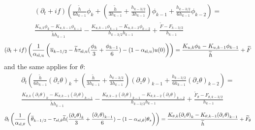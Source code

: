 \begin{equation}
\label{eq:ND_Ocean_prognosticu_FVfree}
    \begin{aligned}
(\partial_t + if)
	    \left(\frac{\widetilde{h}}{6h_{k-1}} 
    \phi_k
    +
    \left(
	    \frac{\widetilde{h}}{3h_{k-1}} 
	    + \frac{h_{k-3/2}}{3h_{k-1}}
    \right)
	    \phi_{k-1}
	    + \frac{h_{k-3/2}}{6h_{k-1}} \phi_{k-2}\right)
    = \\
	     \frac{K_{u, k} \phi_{k} -
	    K_{u,k-1} \phi_{k-1} }{\widetilde{h}h_{k-1}} -
\frac{K_{u, k-1} \phi_{k-1} - K_{u, k-2} \phi_{k-2}}
	    {h_{k-3/2}h_{k-1}} + \frac{\widetilde{F} - F_{k-3/2}}
	    {h_{k-1}}
    \end{aligned}
\end{equation}
\begin{equation}
	\label{eq:ND_Ocean_semiDiscreteEkmanEqFVfree}
	(\partial_t+if) \left(\frac{1}{\alpha_{\rm sl, u}}
	\left(\overline{u}_{k-1/2} - \widetilde{h}\tau_{\rm sl, u}
	(\frac{\phi_k}{3} + \frac{\phi_{k-1}}{6}) - 
	(1-\alpha_{\rm sl, u})u(0)\right)\right)
	= \frac{K_{u, k}\phi_{k} - K_{u,k-1} \phi_{k-1}}{\widetilde{h}}
	+ \widetilde{F}
\end{equation}
and the same applies for $\theta$:
\begin{equation}
\label{eq:ND_Ocean_prognosticPT_FVfree}
    \begin{aligned}
\partial_t \left(\frac{\widetilde{h}}{6h_{k-1}} 
	    {(\partial_z \theta)}_k
    +
    \left(
	    \frac{\widetilde{h}}{3h_{k-1}} 
	    + \frac{h_{k-3/2}}{3h_{k-1}}
    \right)
	    {(\partial_z \theta)}_{k-1}
	    + \frac{h_{k-3/2}}{6h_{k-1}} {(\partial_z \theta)}_{k-2}\right)
    = \\
	    \frac{K_{\theta, k} {(\partial_z \theta)}_{k} -
	    K_{\theta, k-1} {(\partial_z \theta)}_{k-1} }{\widetilde{h}h_{k-1}}
	    -\frac{K_{\theta, k-2} {(\partial_z \theta)}_{k-1} -
	    K_{\theta, k-2} {(\partial_z \theta)}_{k-2}}
	    {h_{k-3/2}h_{k-1}} + \frac{\widetilde{F}_\theta -
	    F_{\theta, k-3/2}}{h_{k-1}}
    \end{aligned}
\end{equation}
\begin{equation}
	\label{eq:ND_Ocean_semiDiscreteEkmanEqPTFVfree}
	\partial_t \left(\frac{1}{\alpha_{\rm sl, \theta}}
	\left(
	\overline{\theta}_{k-1/2} - \tau_{sl, \theta}
	\widetilde{h}(\frac{{(\partial_z \theta)}_k}{3} +
	\frac{{(\partial_z \theta)}_{k-1}}{6})
	 - (1 - \alpha_{sl, \theta})\theta_s
	\right) \right)
	= \frac{K_{\theta, k}{(\partial_z \theta)}_{k} -
	K_{\theta,k-1} {(\partial_z \theta)}_{k-1}}{\widetilde{h}}
	+ \widetilde{F}_\theta 
\end{equation}

